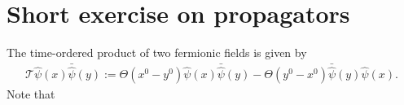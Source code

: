 \documentclass[english, parskip=full]{scrartcl}
\title{\titel}
\author{\autor}
\date{\today}
\renewcommand{\braket}{}
\newcommand{\kla}{}
\newcommand{\klam}{}
\newcommand{\klammer}{}
\renewcommand{\i}{\text{i}}
\begin{document}
\maketitle  %

\section{Short exercise on propagators}
The time-ordered product of two fermionic fields is given by 
\begin{align}
\mathcal{T} \hat{\psi}(x) \bar{\hat{\psi}}(y) := \Theta\kla\left( x^0 - y^0 \right) \hat{\psi}(x) \bar{\hat{\psi}}(y) - \Theta \kla\left( y^0 - x^0 \right) \bar{\hat{\psi}}(y) \hat{\psi}(x).
\end{align}
Note that
\end{document}
